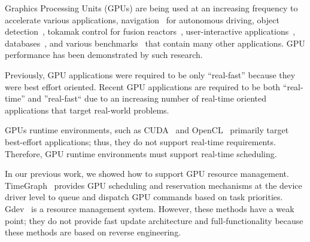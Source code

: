 Graphics Processing Units (GPUs) are being used at an increasing frequency to accelerate various applications,
navigation~\cite{cmu:routing} for autonomous driving, object detection~\cite{hirabayashi:cpsna2013},
tokamak control for fusion reactors~\cite{tokamak},
user-interactive applications~\cite{kato:rtas2011}, databases~\cite{bakkum:sql}, and various benchmarks~\cite{rodinia} that contain many other applications.
GPU performance has been demonstrated by such research.

Previously, GPU applications were required to be only ``real-fast'' because they were best effort oriented.
Recent GPU applications are required to be both ``real-time'' and ''real-fast`` due to an increasing number of real-time oriented applications that target real-world problems.

GPUs runtime environments, such as CUDA~\cite{nvidia:cuda_zone} and OpenCL~\cite{opencl} 
primarily target  best-effort applications; thus, they do not support real-time requirements.
Therefore, GPU runtime environments must support real-time scheduling.

In our previous work,
we showed how to support GPU resource management\cite{kato:timegraph,kato:gdev}.
TimeGraph~\cite{kato:timegraph} provides GPU scheduling and reservation mechanisms at the device driver level to queue and dispatch GPU commands based on task priorities.
Gdev~\cite{kato:gdev} is a resource management system.
However, these methods have a weak point; they do not provide fast update architecture and full-functionality
because these methods are based on reverse engineering.

